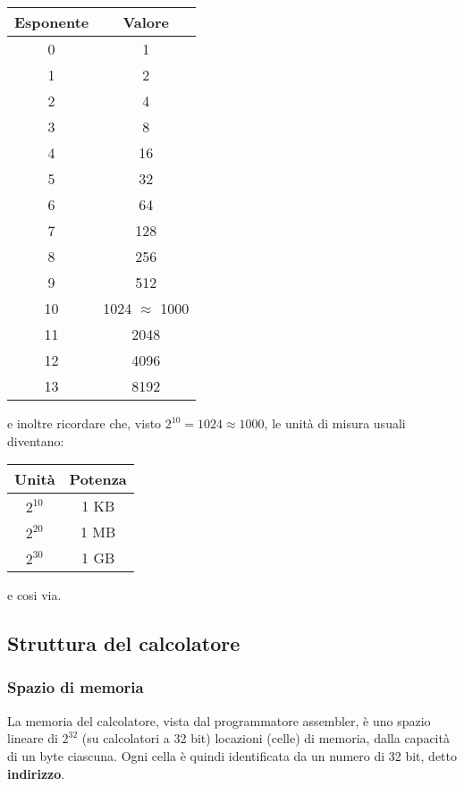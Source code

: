 \documentclass[a4paper,11pt]{article}
\begin{document}
\begin{table}[H]
    \centering
    \begin{tabular}{ c | c  }
        \bfseries Esponente & \bfseries Valore \\
        \hline
				0 & 1 \\
				1 & 2 \\
				2 & 4 \\
				3 & 8 \\
				4 & 16 \\
				5 & 32 \\
				6 & 64 \\
				7 & 128 \\
				8 & 256 \\
				9 & 512 \\
				10 & 1024 $\approx$ 1000 \\
				11 & 2048 \\
				12 & 4096 \\
				13 & 8192 \\
    \end{tabular}
\end{table}

e inoltre ricordare che, visto $2^10 = 1024 \approx 1000$, le unità di misura usuali diventano:

\begin{table}[H]
    \centering
    \begin{tabular}{ c | c }
        \bfseries Unità & \bfseries Potenza \\
        \hline
				$2^{10}$ & 1 KB \\
				$2^{20}$ & 1 MB \\
				$2^{30}$ & 1 GB \\
    \end{tabular}
\end{table}

e cosi via.

\subsection{Struttura del calcolatore}
\subsubsection{Spazio di memoria}
La memoria del calcolatore, vista dal programmatore assembler, è uno spazio lineare di $2^{32}$ (su calcolatori a 32 bit) locazioni (celle) di memoria, dalla capacità di un byte ciascuna.
Ogni cella è quindi identificata da un numero di 32 bit, detto \textbf{indirizzo}.
\end{document}
